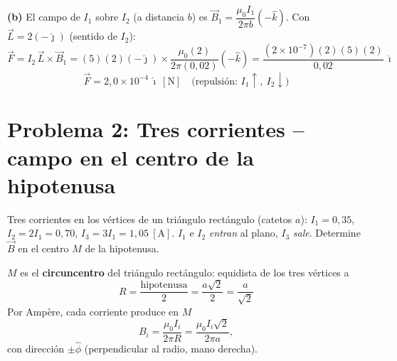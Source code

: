 \documentclass[12pt,letterpaper]{article}
\begin{document}
\noindent\textbf{(b)} El campo de $I_1$ sobre $I_2$ (a distancia $b$) es
$\vec{B}_1 = \dfrac{\mu_0 I_1}{2\pi b}(-\hat{k})$. Con $\vec{L} = 2(-\hat{\jmath})$ (sentido de $I_2$):
\[
    \vec{F} = I_2\,\vec{L}\times\vec{B}_1
    = (5)(2)(-\hat{\jmath})\times\frac{\mu_0 (2)}{2\pi (0{,}02)}(-\hat{k})
    = \frac{(2\times10^{-7})(2)(5)(2)}{0{,}02}\,\hat{\imath}
\]
\[
    \boxed{\vec{F} = 2{,}0\times10^{-4}\,\hat{\imath}\ [\text{N}]\quad\text{(repulsi\'on: }I_1\uparrow,\ I_2\downarrow\text{)}}
\]

\newpage

\section*{Problema 2: Tres corrientes -- campo en el centro de la hipotenusa}

\noindent Tres corrientes en los v\'ertices de un tri\'angulo rect\'angulo (catetos $a$):
$I_1 = 0{,}35$, $I_2 = 2I_1 = 0{,}70$, $I_3 = 3I_1 = 1{,}05\ [\text{A}]$. $I_1$ e $I_2$ \emph{entran}
al plano, $I_3$ \emph{sale}. Determine $\vec{B}$ en el centro $M$ de la hipotenusa.

\medskip

\noindent
\begin{minipage}[t]{0.38\textwidth}
\centering
\vspace{0pt}
\end{minipage}%
\hfill
\begin{minipage}[t]{0.58\textwidth}
\vspace{0pt}
$M$ es el \textbf{circuncentro} del tri\'angulo rect\'angulo: equidista de los tres v\'ertices a
\[
    R = \frac{\text{hipotenusa}}{2} = \frac{a\sqrt{2}}{2} = \frac{a}{\sqrt{2}}
\]
Por Amp\`ere, cada corriente produce en $M$
\[
    B_i = \frac{\mu_0 I_i}{2\pi R} = \frac{\mu_0 I_i \sqrt{2}}{2\pi a},
\]
con direcci\'on $\pm\hat{\phi}$ (perpendicular al radio, mano derecha).
\end{minipage}
\end{document}
